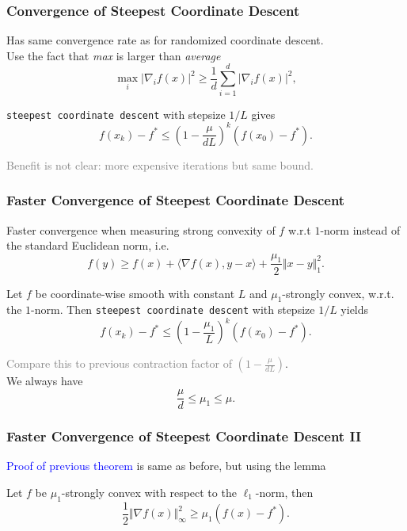 \documentclass[aspectratio=149]{beamer}
\begin{document}
\begin{frame}
  \frametitle{Convergence of Steepest Coordinate Descent}
  Has same convergence rate as for randomized coordinate descent.\\
  Use the fact that \emph{max} is larger than \emph{average}
  \begin{equation}
    \max_i \vert \nabla_i f(x) \vert^2 \ge  \frac{1}{d} \sum_{i=1}^{d} \vert \nabla_i f(x) \vert^2,
  \end{equation}
  \begin{corollary}%
    \colorbox{gray!30}{\textup{\texttt{steepest coordinate descent}}} with stepsize $1/L$ gives
  \begin{equation}
      f(x_k)- f^* \le {\left(1 - \frac{\mu}{d L}\right)}^k (f(x_0)-f^*).
  \end{equation}
  \end{corollary}
  \textcolor{gray}{Benefit is not clear: more expensive iterations but same bound.}
\end{frame}


\begin{frame}
  \frametitle{Faster Convergence of Steepest Coordinate Descent}
  Faster convergence when measuring strong convexity of $f$ w.r.t $1$-norm instead of the standard Euclidean norm, i.e.
  \begin{equation}
      f(y) \ge f(x) + \langle \nabla f(x), y-x \rangle + \frac{\mu_1}{2} \Vert x-y \Vert_1^2.
  \end{equation}

  \begin{theorem}
    Let $f$ be coordinate-wise smooth with constant $L$ and $\mu_1$-strongly convex, w.r.t. the $1$-norm.
    Then \colorbox{gray!30}{\textup{\texttt{steepest coordinate descent}}} with stepsize $1/L$ yields
    \begin{equation}
      f(x_k)- f^* \le {\left(1 - \frac{\mu_1}{L}\right)}^k (f(x_0)-f^*).
    \end{equation}
  \end{theorem}
  \textcolor{gray}{Compare this to previous contraction factor of $(1-\frac{\mu}{d L})$}.\\
  We always have
  \begin{equation}
    \frac{\mu}{d} \le \mu_1 \le \mu.
  \end{equation}
\end{frame}


\begin{frame}
  \frametitle{Faster Convergence of Steepest Coordinate Descent II}
  \textcolor{blue}{Proof of previous theorem} is same as before, but using the lemma

  \begin{lemma}%
    Let $f$ be $\mu_1$-strongly convex with respect to the $\ell_1$-norm, then
    \begin{equation}
      \frac12 \Vert \nabla f(x) \Vert^2_\infty \ge \mu_1 (f(x)-f^*).
    \end{equation}

  \end{lemma}
\end{frame}
\end{document}
